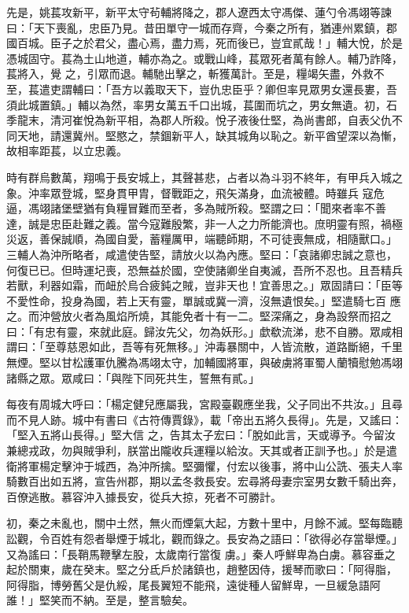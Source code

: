\begin{pinyinscope}
 先是，姚萇攻新平，新平太守茍輔將降之，郡人遼西太守馮傑、蓮勺令馮翊等諫曰：「天下喪亂，忠臣乃見。昔田單守一城而存齊，今秦之所有，猶連州累鎮，郡國百城。臣子之於君父，盡心焉，盡力焉，死而後已，豈宜貳哉！」輔大悅，於是憑城固守。萇為土山地道，輔亦為之。或戰山峰，萇眾死者萬有餘人。輔乃詐降，萇將入，覺
 之，引眾而退。輔馳出擊之，斬獲萬計。至是，糧竭矢盡，外救不至，萇遣吏謂輔曰：「吾方以義取天下，豈仇忠臣乎？卿但率見眾男女還長婁，吾須此城置鎮。」輔以為然，率男女萬五千口出城，萇圍而坑之，男女無遺。初，石季龍末，清河崔悅為新平相，為郡人所殺。悅子液後仕堅，為尚書郎，自表父仇不同天地，請還冀州。堅愍之，禁錮新平人，缺其城角以恥之。新平酋望深以為慚，故相率距萇，以立忠義。



 時有群烏數萬，翔鳴于長安城上，其聲甚悲，占者以為斗羽不終年，有甲兵入城之象。沖率眾登城，堅身貫甲胄，督戰距之，飛矢滿身，血流被體。時雖兵
 寇危逼，馮翊諸堡壁猶有負糧冒難而至者，多為賊所殺。堅謂之曰：「聞來者率不善達，誠是忠臣赴難之義。當今寇難殷繁，非一人之力所能濟也。庶明靈有照，禍極災返，善保誠順，為國自愛，蓄糧厲甲，端聽師期，不可徒喪無成，相隨獸口。」三輔人為沖所略者，咸遣使告堅，請放火以為內應。堅曰：「哀諸卿忠誠之意也，何復已已。但時運圮喪，恐無益於國，空使諸卿坐自夷滅，吾所不忍也。且吾精兵若獸，利器如霜，而衄於烏合疲鈍之賊，豈非天也！宜善思之。」眾固請曰：「臣等不愛性命，投身為國，若上天有靈，單誠或冀一濟，沒無遺恨矣。」堅遣騎七百
 應之。而沖營放火者為風焰所燒，其能免者十有一二。堅深痛之，身為設祭而招之曰：「有忠有靈，來就此庭。歸汝先父，勿為妖形。」歔欷流涕，悲不自勝。眾咸相謂曰：「至尊慈恩如此，吾等有死無移。」沖毒暴關中，人皆流散，道路斷絕，千里無煙。堅以甘松護軍仇騰為馮翊太守，加輔國將軍，與破虜將軍蜀人蘭犢慰勉馮翊諸縣之眾。眾咸曰：「與陛下同死共生，誓無有貳。」



 每夜有周城大呼曰：「楊定健兒應屬我，宮殿臺觀應坐我，父子同出不共汝。」且尋而不見人跡。城中有書曰《古符傳賈錄》，載「帝出五將久長得」。先是，又謠曰：「堅入五將山長得。」堅大信
 之，告其太子宏曰：「脫如此言，天或導予。今留汝兼總戎政，勿與賊爭利，朕當出隴收兵運糧以給汝。天其或者正訓予也。」於是遣衛將軍楊定擊沖于城西，為沖所擒。堅彌懼，付宏以後事，將中山公詵、張夫人率騎數百出如五將，宣告州郡，期以孟冬救長安。宏尋將母妻宗室男女數千騎出奔，百僚逃散。慕容沖入據長安，從兵大掠，死者不可勝計。



 初，秦之未亂也，關中土然，無火而煙氣大起，方數十里中，月餘不滅。堅每臨聽訟觀，令百姓有怨者舉煙于城北，觀而錄之。長安為之語曰：「欲得必存當舉煙。」又為謠曰：「長鞘馬鞭擊左股，太歲南行當復
 虜。」秦人呼鮮卑為白虜。慕容垂之起於關東，歲在癸末。堅之分氐戶於諸鎮也，趙整因侍，援琴而歌曰：「阿得脂，阿得脂，博勞舊父是仇綏，尾長翼短不能飛，遠徙種人留鮮卑，一旦緩急語阿誰！」堅笑而不納。至是，整言驗矣。




\end{pinyinscope}
